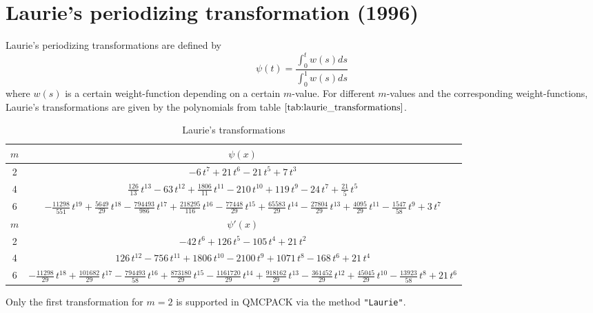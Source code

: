 \section{Laurie's periodizing transformation (1996)}

Laurie's periodizing transformations \cite{laurie96} are defined by
\[
\psi(t) = \frac{\int_{0}^{t}w(s)ds}{\int_{0}^{1}w(s)ds}
\]
where $w(s)$ is a certain weight-function depending on a certain $m$-value.
For different $m$-values and the corresponding weight-functions, Laurie's
transformations are given by the polynomials from table
$\ref{tab:laurie_transformations}$.
%
\begin{table}
\small
\centering
\begin{tabular}{|c|c|} \hline
$m$ & $\psi(x)$ \\ \hline
2 & $-6\,{t}^{7}+21\,{t}^{6}-21\,{t}^{5}+7\,{t}^{3}$  \\
%
4 & ${\frac {126}{13}}\,{t}^{13}-63\,{t}^{12}+{\frac {1806}{11}}\,{t}^{11}-
210\,{t}^{10}+119\,{t}^{9}-24\,{t}^{7}+{\frac {21}{5}}\,{t}^{5}$  \\
%
6 & $-{\frac {11298}{551}}\,{t}^{19}+{\frac {5649}{29}}\,{t}^{18}-{\frac {
794493}{986}}\,{t}^{17}+{\frac {218295}{116}}\,{t}^{16}-{\frac {77448}
{29}}\,{t}^{15}+{\frac {65583}{29}}\,{t}^{14}-{\frac {27804}{29}}\,{t}
^{13}+{\frac {4095}{29}}\,{t}^{11}-{\frac {1547}{58}}\,{t}^{9}+3\,{t}^
{7}$  \\ \hline
$m$ & $\psi'(x)$ \\ \hline
2 & $-42\,{t}^{6}+126\,{t}^{5}-105\,{t}^{4}+21\,{t}^{2}$ \\
%
4 & $126\,{t}^{12}-756\,{t}^{11}+1806\,{t}^{10}-2100\,{t}^{9}+1071\,{t}^{8}
-168\,{t}^{6}+21\,{t}^{4}$ \\
%
6 & $-{\frac {11298}{29}}\,{t}^{18}+{\frac {101682}{29}}\,{t}^{17}-{\frac {
794493}{58}}\,{t}^{16}+{\frac {873180}{29}}\,{t}^{15}-{\frac {1161720}
{29}}\,{t}^{14}+{\frac {918162}{29}}\,{t}^{13}-{\frac {361452}{29}}\,{
t}^{12}+{\frac {45045}{29}}\,{t}^{10}-{\frac {13923}{58}}\,{t}^{8}+21
\,{t}^{6}$ \\ \hline
\end{tabular}
\caption{Laurie's transformations}
\label{tab:laurie_transformations}
\end{table}
%
Only the first transformation for $m=2$ is supported in QMCPACK via the method
\verb!"Laurie"!.
